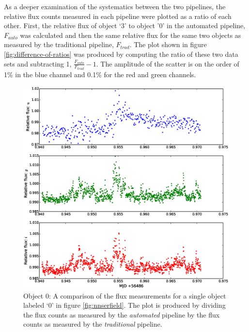 As a deeper examination of the systematics between the two pipelines, the relative flux counts measured in each pipeline were plotted as a ratio of each other. First, the relative flux of object `3' to object '0' in the automated pipeline, $F_{auto}$ was calculated and then the same relative flux for the same two objects as measured by the traditional pipeline, $F_{trad}$. The plot shown in figure  \ref{fig:difference-of-ratios} was produced by computing the ratio of these two data sets and subtracting 1,  $\frac{F_{auto}}{F_{trad}} - 1$. The amplitude of the scatter is on the order of 1\% in the blue channel and 0.1\% for the red and green channels. 

\begin{figure}
\centering
\includegraphics[width=140mm]{images/compare_photometry.eps}
\caption{Object 0: A comparison of the flux measurements for a single object labeled `0' in figure \ref{fig:nnserfield}. The plot is produced by dividing the flux counts as measured by the \emph{automated} pipeline by the flux counts as measured by the \emph{traditional} pipeline.}
\label{fig:comparephotometry}
\end{figure}

